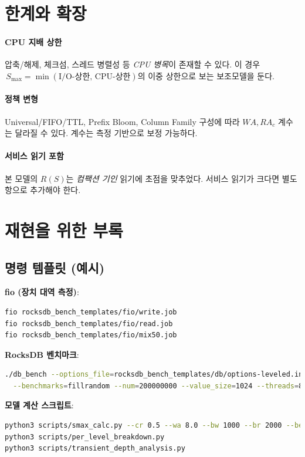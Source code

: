 \documentclass[11pt,a4paper]{article}
\begin{document}
\section{한계와 확장}
\paragraph{CPU 지배 상한} 압축/해제, 체크섬, 스레드 병렬성 등 \emph{CPU 병목}이 존재할 수 있다.
이 경우 \(\,S_{\max}=\min(\text{I/O-상한},\,\text{CPU-상한})\)의 이중 상한으로 보는 보조모델을 둔다.
\paragraph{정책 변형} Universal/FIFO/TTL, Prefix Bloom, Column Family 구성에 따라 \(WA,RA_c\) 계수는 달라질 수 있다.
계수는 측정 기반으로 보정 가능하다.
\paragraph{서비스 읽기 포함} 본 모델의 \(R(S)\)는 \emph{컴팩션 기인} 읽기에 초점을 맞추었다.
서비스 읽기가 크다면 별도 항으로 추가해야 한다.

\section{재현을 위한 부록}
\subsection{명령 템플릿 (예시)}
\noindent\textbf{fio (장치 대역 측정)}:
\begin{lstlisting}[language=bash,basicstyle=\ttfamily\small]
fio rocksdb_bench_templates/fio/write.job
fio rocksdb_bench_templates/fio/read.job
fio rocksdb_bench_templates/fio/mix50.job
\end{lstlisting}

\noindent\textbf{RocksDB 벤치마크}:
\begin{lstlisting}[language=bash,basicstyle=\ttfamily\small]
./db_bench --options_file=rocksdb_bench_templates/db/options-leveled.ini \
  --benchmarks=fillrandom --num=200000000 --value_size=1024 --threads=8
\end{lstlisting}

\noindent\textbf{모델 계산 스크립트}:
\begin{lstlisting}[language=bash,basicstyle=\ttfamily\small]
python3 scripts/smax_calc.py --cr 0.5 --wa 8.0 --bw 1000 --br 2000 --beff 2500
python3 scripts/per_level_breakdown.py
python3 scripts/transient_depth_analysis.py
\end{lstlisting}
\end{document}
